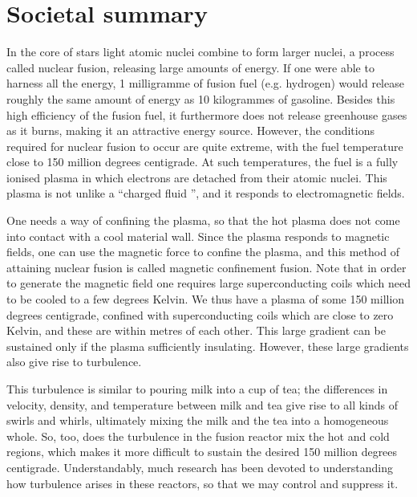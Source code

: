\chapter*{Societal summary}

In the core of stars light atomic nuclei combine to form larger nuclei, a process called nuclear fusion, releasing large amounts of energy. If one were able to harness all the energy, 1 milligramme of fusion fuel (e.g. hydrogen) would release roughly the same amount of energy as 10 kilogrammes of gasoline. Besides this high efficiency of the fusion fuel, it furthermore does not release greenhouse gases as it burns, making it an attractive energy source. However, the conditions required for nuclear fusion to occur are quite extreme, with the fuel temperature close to 150 million degrees centigrade. At such temperatures, the fuel is a fully ionised plasma in which electrons are detached from their atomic nuclei. This plasma is not unlike a ``charged fluid '', and it responds to electromagnetic fields. \par  
One needs a way of confining the plasma, so that the hot plasma does not come into contact with a cool material wall. Since the plasma responds to magnetic fields, one can use the magnetic force to confine the plasma, and this method of attaining nuclear fusion is called magnetic confinement fusion. Note that in order to generate the magnetic field one requires large superconducting coils which need to be cooled to a few degrees Kelvin. We thus have a plasma of some 150 million degrees centigrade, confined with superconducting coils which are close to zero Kelvin, and these are within metres of each other. This large gradient can be sustained only if the plasma sufficiently insulating. However, these large gradients also give rise to turbulence. \par
This turbulence is similar to pouring milk into a cup of tea; the differences in velocity, density, and temperature between milk and tea give rise to all kinds of swirls and whirls, ultimately mixing the milk and the tea into a homogeneous whole. So, too, does the turbulence in the fusion reactor mix the hot and cold regions, which makes it more difficult to sustain the desired 150 million degrees centigrade. Understandably, much research has been devoted to understanding how turbulence arises in these reactors, so that we may control and suppress it. \par 
